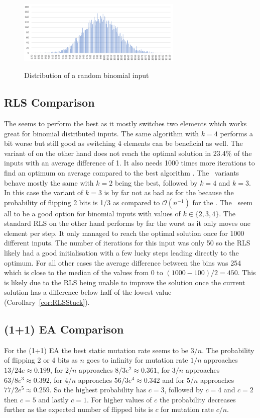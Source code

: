 \begin{figure}[h]
      \caption{Distribution of a random binomial input}
      \centering
      \includegraphics[width=0.7\textwidth]{figures/images/numberGenerator/binomialDistributionForN10000p0_1.png}\label{fig:binDistExample}
\end{figure}
\subsection{RLS Comparison}




The \RLSN[2] seems to perform the best as it mostly switches two elements which works great for binomial distributed inputs.
The same algorithm with $k=4$ performs a bit worse but still good as switching 4 elements can be beneficial as well.
The variant of \RLSN[3] on the other hand does not reach the optimal solution in 23.4\% of the inputs with an average difference of 1.
It also needs 1000 times more iterations to find an optimum on average compared to the best algorithm \RLSN[2].
The \RLSR~variants behave mostly the same with $k=2$ being the best, followed by $k=4$ and $k=3$.
In this case the variant of $k=3$ is by far not as bad as for the \RLSN[3] because the probability of flipping 2 bits is 1/3 as compared to $\mathcal{O}(n^{-1})$ for the \RLSN[3].
The \RLSR~seem all to be a good option for binomial inputs with values of $k\in\{2,3,4\}$.
The standard RLS on the other hand performs by far the worst as it only moves one element per step.
It only managed to reach the optimal solution once for 1000 different inputs.
The number of iterations for this input was only 50 so the RLS likely had a good initialisation with a few lucky steps leading directly to the optimum.
For all other cases the average difference between the bins was 254 which is close to the median of the values from 0 to $(1000-100)/2=450$.
This is likely due to the RLS being unable to improve the solution once the current solution has a difference below half of the lowest value (Corollary~\ref{cor:RLSStuck}).
\subsection{(1+1) EA Comparison}
For the (1+1) EA the best static mutation rate seems to be $3/n$. 
The probability of flipping 2 or 4 bits as $n$ goes to infinity for mutation rate $1/n$ approaches $13/24e\approx 0.199$, for $2/n$ approaches $8/3e^2\approx 0.361$, for $3/n$ approaches $63/8e^3\approx 0.392$, for $4/n$ approaches $56/3e^4\approx 0.342$ and for $5/n$ approaches $77/2e^5\approx 0.259$.
So the highest probability has $c=3$, followed by $c=4$ and $c=2$ then $c=5$ and lastly $c=1$.
For higher values of $c$ the probability decreases further as the expected number of flipped bits is $c$ for mutation rate $c/n$.


